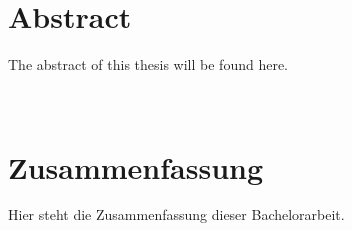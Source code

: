 \section*{Abstract}

The abstract of this thesis will be found here.

~~

\section*{Zusammenfassung}

Hier steht die Zusammenfassung dieser Bachelorarbeit.

\pagebreak

